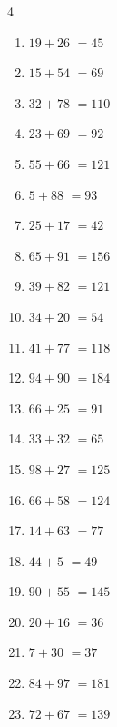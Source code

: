 \begin{multicols}{4}
\begin{enumerate}
  \item $19+26$
        $=45$

  \item $15+54$
        $=69$

  \item $32+78$
        $=110$

  \item $23+69$
        $=92$

  \item $55+66$
        $=121$

  \item $5+88$
        $=93$

  \item $25+17$
        $=42$

  \item $65+91$
        $=156$

  \item $39+82$
        $=121$

\columnbreak %

  \item $34+20$
        $=54$

  \item $41+77$
        $=118$

  \item $94+90$
        $=184$

  \item $66+25$
        $=91$

  \item $33+32$
        $=65$

  \item $98+27$
        $=125$

  \item $66+58$
        $=124$

  \item $14+63$
        $=77$

  \item $44+5$
        $=49$

  \item $90+55$
        $=145$

  \item $20+16$
        $=36$

  \item $7+30$
        $=37$

  \item $84+97$
        $=181$

  \item $72+67$
        $=139$


\end{enumerate}
\end{multicols}
